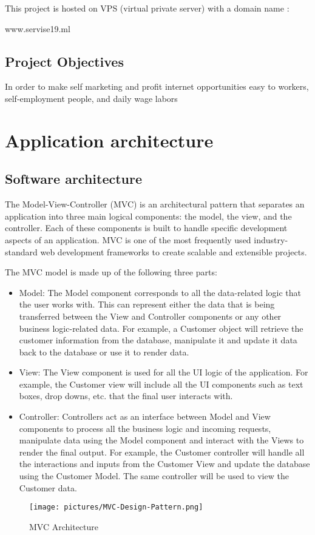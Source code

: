 \documentclass[12pt]{report}
\begin{document}
This project is hosted on VPS (virtual private server) with a domain name :

www.servise19.ml




\subsection{Project Objectives}




In order to make self marketing and profit internet opportunities easy to workers, self-employment people, and daily wage labors \newline

\section{Application architecture}
\subsection{Software architecture}
The Model-View-Controller (MVC) is an architectural pattern that separates an application into three main logical components: the model, the view, and the controller. Each of these components is built to handle specific development aspects of an application. MVC is one of the most frequently used industry-standard web development frameworks to create scalable and extensible projects.\newline

The MVC model is made up of the following three parts:
\begin{itemize}
  \item Model: The Model component corresponds to all the data-related logic that the user works with. This can represent either the data that is being transferred between the View and Controller components or any other business logic-related data. For example, a Customer object will retrieve the customer information from the database, manipulate it and update it data back to the database or use it to render data.
  \item View: The View component is used for all the UI logic of the application. For example, the Customer view will include all the UI components such as text boxes, drop downs, etc. that the final user interacts with.
  \item Controller: Controllers act as an interface between Model and View components to process all the business logic and incoming requests, manipulate data using the Model component and interact with the Views to render the final output. For example, the Customer controller will handle all the interactions and inputs from the Customer View and update the database using the Customer Model. The same controller will be used to view the Customer data.
\end{itemize}
\begin{figure}[!htbp]
    \centering
    \texttt{[image: pictures/MVC-Design-Pattern.png]}
    \caption{MVC Architecture}
    \label{fig:mvc}
\end{figure}
\pagebreak
\end{document}
